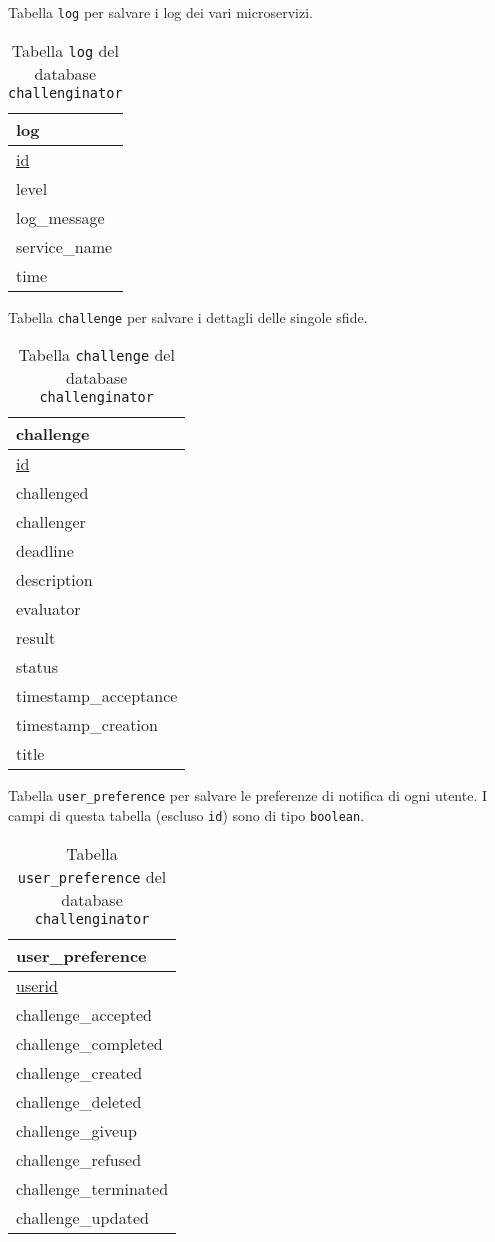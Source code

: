 Tabella \texttt{log} per salvare i log dei vari microservizi.
\begin{table}[H]
    \centering
    \begin{tabular}{|p{4cm}|}
    \hline
    \textbf{log}\\\hline
    \underline{id}\\
    level\\
    log\_message\\
    service\_name\\
    time\\\hline
    \end{tabular}
    \caption{Tabella \texttt{log} del database \texttt{challenginator}}
\end{table}

Tabella \texttt{challenge} per salvare i dettagli delle singole sfide.
\begin{table}[H]
    \centering
    \begin{tabular}{|p{4cm}|}
    \hline
    \textbf{challenge}\\\hline
    \underline{id}\\
    challenged\\
    challenger\\
    deadline\\
    description\\
    evaluator\\
    result\\
    status\\
    timestamp\_acceptance\\
    timestamp\_creation\\
    title\\\hline
    \end{tabular}
    \caption{Tabella \texttt{challenge} del database \texttt{challenginator}}
\end{table}

Tabella \texttt{user\_preference} per salvare le preferenze di notifica di ogni utente. I campi di questa tabella (escluso \texttt{id}) sono di tipo \texttt{boolean}.
\begin{table}[H]
    \centering
    \begin{tabular}{|p{4cm}|}
    \hline
    \textbf{user\_preference}\\\hline
    \underline{userid}\\
    challenge\_accepted\\
    challenge\_completed\\
    challenge\_created\\
    challenge\_deleted\\
    challenge\_giveup\\
    challenge\_refused\\
    challenge\_terminated\\
    challenge\_updated\\\hline
    \end{tabular}
    \caption{Tabella \texttt{user\_preference} del database \texttt{challenginator}}
\end{table}